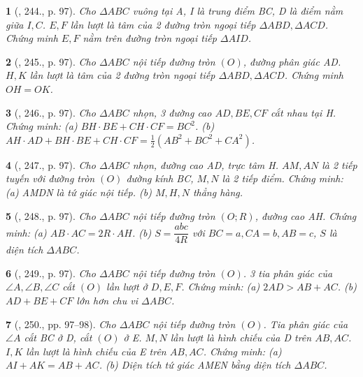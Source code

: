 \documentclass{article}
\newtheorem{baitoan}{}
\begin{document}
\begin{baitoan}[\cite{Binh_Toan_9_tap_2}, 244., p. 97]
	Cho $\Delta ABC$ vuông tại A, I là trung điểm BC, D là điểm nằm giữa $I,C$. $E,F$ lần lượt là tâm của 2 đường tròn ngoại tiếp $\Delta ABD,\Delta ACD$. Chứng minh $E,F$ nằm trên đường tròn ngoại tiếp $\Delta AID$.
\end{baitoan}

\begin{baitoan}[\cite{Binh_Toan_9_tap_2}, 245., p. 97]
	Cho $\Delta ABC$ nội tiếp đường tròn $(O)$, đường phân giác AD. $H,K$ lần lượt là tâm của 2 đường tròn ngoại tiếp $\Delta ABD,\Delta ACD$. Chứng minh $OH = OK$.
\end{baitoan}

\begin{baitoan}[\cite{Binh_Toan_9_tap_2}, 246., p. 97]
	Cho $\Delta ABC$ nhọn, 3 đường cao $AD,BE,CF$ cắt nhau tại H. Chứng minh: (a) $BH\cdot BE + CH\cdot CF = BC^2$. (b) $AH\cdot AD + BH\cdot BE + CH\cdot CF = \frac{1}{2}(AB^2 + BC^2 + CA^2)$.
\end{baitoan}

\begin{baitoan}[\cite{Binh_Toan_9_tap_2}, 247., p. 97]
	Cho $\Delta ABC$ nhọn, đường cao AD, trực tâm H. $AM,AN$ là 2 tiếp tuyến với đường tròn $(O)$ đường kính BC, $M,N$ là 2 tiếp điểm. Chứng minh: (a) AMDN là tứ giác nội tiếp. (b) $M,H,N$ thẳng hàng.
\end{baitoan}

\begin{baitoan}[\cite{Binh_Toan_9_tap_2}, 248., p. 97]
	Cho $\Delta ABC$ nội tiếp đường tròn $(O;R)$, đường cao AH. Chứng minh: (a) $AB\cdot AC = 2R\cdot AH$. (b) $S = \dfrac{abc}{4R}$ với $BC = a,CA = b,AB = c$, $S$ là diện tích $\Delta ABC$.
\end{baitoan}

\begin{baitoan}[\cite{Binh_Toan_9_tap_2}, 249., p. 97]
	Cho $\Delta ABC$ nội tiếp đường tròn $(O)$. 3 tia phân giác của $\angle{A},\angle{B},\angle{C}$ cắt $(O)$ lần lượt ở $D,E,F$. Chứng minh: (a) $2AD > AB + AC$. (b) $AD + BE + CF$ lớn hơn chu vi $\Delta ABC$.
\end{baitoan}

\begin{baitoan}[\cite{Binh_Toan_9_tap_2}, 250., pp. 97--98]
	Cho $\Delta ABC$ nội tiếp đường tròn $(O)$. Tia phân giác của $\angle{A}$ cắt BC ở D, cắt $(O)$ ở E. $M,N$ lần lượt là hình chiếu của D trên $AB,AC$. $I,K$ lần lượt là hình chiếu của E trên $AB,AC$. Chứng minh: (a) $AI + AK = AB + AC$. (b) Diện tích tứ giác AMEN bằng diện tích $\Delta ABC$.
\end{baitoan}
\end{document}
